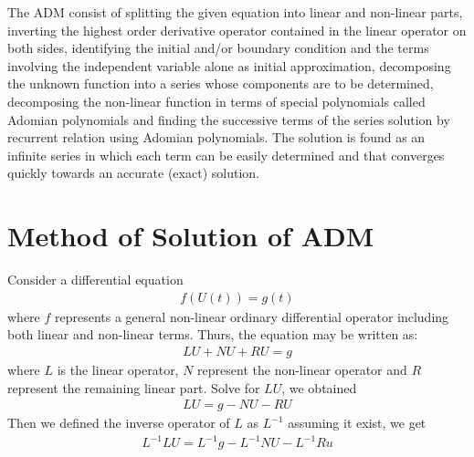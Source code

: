 \documentclass[11pt]{report}
\newcommand{\NI}{\noindent}
\begin{document}
	\NI The ADM consist of splitting the given equation into linear and non-linear parts, inverting the highest order derivative operator contained in the linear operator on both sides, identifying the initial and/or boundary condition and the terms involving the independent variable alone as initial approximation, decomposing the unknown function into a series whose components are to be determined, decomposing the non-linear function in terms of special polynomials called Adomian polynomials and finding the successive terms of the series solution by recurrent relation using Adomian polynomials. The solution is found as an infinite series in which each term can be easily determined and that converges quickly towards an accurate (exact) solution.
	
	\section{Method of Solution of ADM}
	Consider a differential equation
	\begin{eqnarray}
		f(U(t)) = g(t)
	\end{eqnarray}
	where $f$ represents a general non-linear ordinary differential operator including both linear and non-linear terms. Thurs, the equation may be written as:
	\begin{eqnarray}
		LU + NU + RU = g
	\end{eqnarray}
	where $L$ is the linear operator, $N$ represent the non-linear operator and $R$ represent the remaining linear part. Solve for $LU$, we obtained
	\begin{eqnarray}
		LU = g - NU - RU
	\end{eqnarray}
	Then we defined the inverse operator of $L$ as $L^{-1}$ assuming it exist, we get
	\begin{eqnarray}
		L^{-1}LU =L^{-1}g - L^{-1}NU - L^{-1}Ru \label{eq:3_5}
	\end{eqnarray}
	
\end{document}

